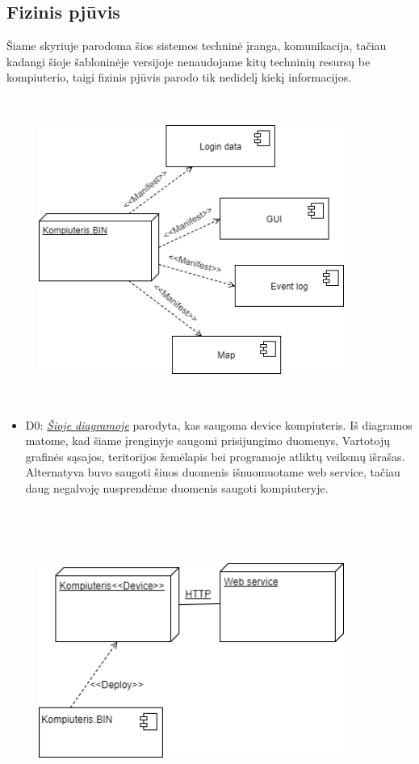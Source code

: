 \documentclass[oneside]{VUMIFPSkursinis}
\begin{document}
\subsection{Fizinis pjūvis}
	Šiame skyriuje parodoma šios sistemos techninė įranga, komunikacija, tačiau kadangi šioje šabloninėje versijoje nenaudojame kitų techninių resursų be kompiuterio, taigi fizinis pjūvis parodo tik nedidelį kiekį informacijos.
	\newline
	\vskip 0.5cm
	\begin{figure}[H]
	\centering	
	\includegraphics[width=10cm,height=10cm,keepaspectratio]{Deployment.png}
	\caption{}
	\label{fig:Deployment}
\end{figure}
	\begin{itemize}
		\item D0: \hyperref[fig:Deployment]{\textit{Šioje diagramoje}} parodyta, kas saugoma device kompiuteris. 
		Iš diagramos matome, kad šiame įrenginyje saugomi prisijungimo duomenys, Vartotojų grafinės sąsajos, teritorijos žemėlapis bei programoje atliktų veiksmų išrašas. Alternatyva buvo saugoti šiuos duomenis išnuomuotame web service, tačiau daug negalvoję nusprendėme duomenis saugoti kompiuteryje.
	\end{itemize}
		\begin{figure}[H]
		\centering	
	\includegraphics[width=10cm,height=10cm,keepaspectratio]{Deployment0.png}
	\caption{}
	\label{fig:Deployment0}
\end{figure}
\end{document}
